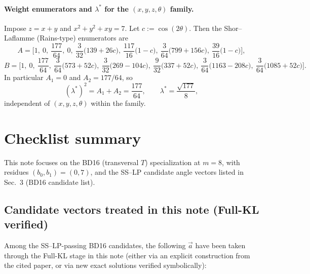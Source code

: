 \documentclass[11pt]{article}
\begin{document}
\paragraph{Weight enumerators and $\lambda^\ast$ for the $(x,y,z,\theta)$ family.}
Impose $z=x+y$ and $x^2+y^2+xy=7$.  Let $c:=\cos(2\theta)$.  Then the Shor--Laflamme
(Rains-type) enumerators are
\[
A=\Big[
1,\ 0,\ \frac{177}{64},\ 0,\ \frac{3}{32}\bigl(139+26c\bigr),\ \frac{117}{16}\bigl(1-c\bigr),\ 
\frac{3}{64}\bigl(799+156c\bigr),\ \frac{39}{16}\bigl(1-c\bigr)
\Big],
\]
\[
B=\Big[
1,\ 0,\ \frac{177}{64},\ \frac{3}{64}\bigl(573+52c\bigr),\ \frac{3}{32}\bigl(269-104c\bigr),\ 
\frac{9}{32}\bigl(337+52c\bigr),\ \frac{3}{64}\bigl(1163-208c\bigr),\ \frac{3}{64}\bigl(1085+52c\bigr)
\Big].
\]
In particular $A_1=0$ and $A_2=177/64$, so
\[
(\lambda^\ast)^2=A_1+A_2=\frac{177}{64},
\qquad
\lambda^\ast=\frac{\sqrt{177}}{8},
\]
independent of $(x,y,z,\theta)$ within the family.



\section{Checklist summary}

This note focuses on the BD16 (transversal \(T\)) specialization at \(m=8\), with residues \((b_0,b_1)=(0,7)\), and the SS--LP candidate angle vectors listed in Sec.~3 (BD16 candidate list).

\subsection{Candidate vectors treated in this note (Full-KL verified)}

Among the SS--LP-passing BD16 candidates, the following \(\vec a\) have been taken through the Full-KL stage in this note (either via an explicit construction from the cited paper, or via new exact solutions verified symbolically):
\end{document}
